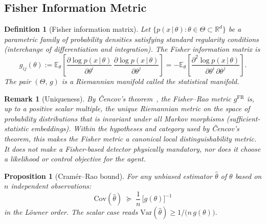 \documentclass[12pt,a4paper,openany]{book}
\newtheorem{proposition}[theorem]{Proposition}
\newtheorem{definition}[theorem]{Definition}
\newtheorem{remark}[theorem]{Remark}
\begin{document}
\subsection{Fisher Information Metric}
\label{III-subsec:fisher}

\begin{definition}[Fisher information matrix]
\label{III-def:fisher}
Let $\{p(x\,|\,\theta) : \theta \in \Theta
\subset \mathbb{R}^d\}$ be a parametric family of
probability densities satisfying standard regularity
conditions (interchange of differentiation and integration).
The \emph{Fisher information matrix} is
\begin{equation}
\label{III-eq:fisher_def}
g_{ij}(\theta)
:= \mathbb{E}_\theta\!\left[
  \frac{\partial \log p(x\,|\,\theta)}
       {\partial \theta^i}\,
  \frac{\partial \log p(x\,|\,\theta)}
       {\partial \theta^j}
\right]
= -\mathbb{E}_\theta\!\left[
  \frac{\partial^2 \log p(x\,|\,\theta)}
       {\partial \theta^i\,\partial \theta^j}
\right].
\end{equation}
The pair $(\Theta,\,g)$ is a Riemannian manifold called the
\emph{statistical manifold}.
\end{definition}

\begin{remark}[Uniqueness]
\label{III-rem:cencov}
By \v{C}encov's theorem~\cite{Cencov1982}, the Fisher--Rao
metric $g^{\mathrm{FR}}$ is, up to a positive scalar
multiple, the unique Riemannian metric on the space of
probability distributions that is invariant under all
Markov morphisms (sufficient-statistic embeddings).
Within the hypotheses and category used by \v{C}encov's theorem, this
makes the Fisher metric a canonical local distinguishability metric.
It does not make a Fisher-based detector physically mandatory, nor does
it choose a likelihood or control objective for the agent.
\end{remark}

\begin{proposition}[Cram\'{e}r--Rao bound]
\label{III-prop:CR}
For any unbiased estimator $\hat{\theta}$ of $\theta$ based
on $n$ independent observations:
\begin{equation}
\label{III-eq:CR}
\mathrm{Cov}(\hat{\theta})
\;\succeq\; \frac{1}{n}\,\bigl[g(\theta)\bigr]^{-1}
\end{equation}
in the L\"{o}wner order.
The scalar case reads
$\mathrm{Var}(\hat{\theta})
\geq 1/\bigl(n\,g(\theta)\bigr)$.
\end{proposition}
\end{document}
